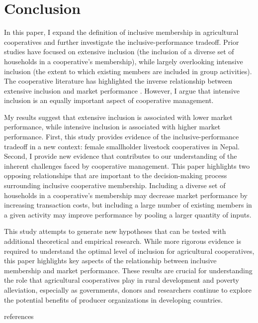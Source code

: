 \documentclass[11pt]{article}
\begin{document}
\section{Conclusion}

In this paper, I expand the definition of inclusive membership in agricultural cooperatives and further investigate the inclusive-performance tradeoff. Prior studies have focused on extensive inclusion (the inclusion of a diverse set of households in a cooperative's membership), while largely overlooking intensive inclusion (the extent to which existing members are included in group activities). The cooperative literature has highlighted the inverse relationship between extensive inclusion and market performance \citep{berdegue_cooperating_2001,bernard_reaching_2009,world_bank_world_2008}. However, I argue that intensive inclusion is an equally important aspect of cooperative management. 

My results suggest that extensive inclusion is associated with lower market performance, while intensive inclusion is associated with higher market performance. First, this study provides evidence of the inclusive-performance tradeoff in a new context: female smallholder livestock cooperatives in Nepal. Second, I provide new evidence that contributes to our understanding of the inherent challenges faced by cooperative management.  This paper highlights two opposing relationships that are important to the decision-making process surrounding inclusive cooperative membership. Including a diverse set of households in a cooperative's membership may decrease market performance by increasing transaction costs, but including a large number of existing members in a given activity may improve performance by pooling a larger quantity of inputs. 

This study attempts to generate new hypotheses that can be tested with additional theoretical and empirical research. While more rigorous evidence is required to understand the optimal level of inclusion for agricultural cooperatives, this paper highlights key aspects of the relationship between inclusive membership and market performance. These results are crucial for understanding the role that agricultural cooperatives play in rural development and poverty alleviation, especially as governments, donors and researchers continue to explore the potential benefits of producer organizations in developing countries. 


\newpage
 {references}
\end{document}
